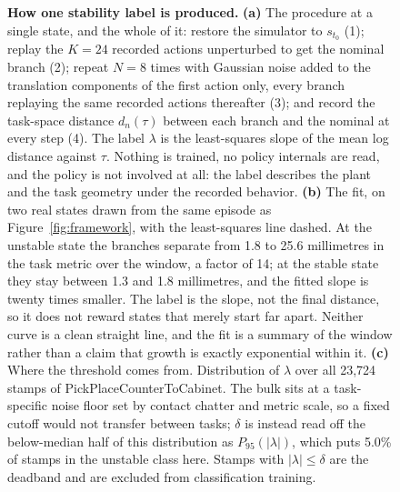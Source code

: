 \begin{figure}[t]
\caption{\textbf{How one stability label is produced.}
\textbf{(a)} The procedure at a single state, and the whole of it: restore the
simulator to $s_{t_0}$ (1); replay the $K{=}24$ recorded actions unperturbed to
get the nominal branch (2); repeat $N{=}8$ times with Gaussian noise added to
the translation components of the first action only, every branch replaying the
same recorded actions thereafter (3); and record the task-space distance
$d_n(\tau)$ between each branch and the nominal at every step (4). The label
$\lambda$ is the least-squares slope of the mean log distance against $\tau$.
Nothing is trained, no policy internals are read, and the policy is not involved
at all: the label describes the plant and the task geometry under the recorded
behavior.
\textbf{(b)} The fit, on two real states drawn from the same episode as
Figure~\ref{fig:framework}, with the least-squares line dashed. At the unstable
state the branches separate from 1.8 to 25.6 millimetres in the task metric
over the window, a factor of 14; at the stable state they stay between 1.3 and
1.8 millimetres,
and the fitted slope is twenty times smaller. The label is the slope,
not the final distance, so it does not reward states that merely start far
apart. Neither curve is a clean straight line, and the fit is a summary of the
window rather than a claim that growth is exactly exponential within it.
\textbf{(c)} Where the threshold comes from. Distribution of $\lambda$ over all
23{,}724 stamps of PickPlaceCounterToCabinet. The bulk sits at a task-specific
noise floor set by contact chatter and metric scale, so a fixed cutoff would not
transfer between tasks; $\delta$ is instead read off the below-median half of
this distribution as $P_{95}(\lvert\lambda\rvert)$, which puts 5.0\% of stamps
in the unstable class here. Stamps with $\lvert\lambda\rvert \le \delta$ are the
deadband and are excluded from classification training.}
\label{fig:labeling}
\end{figure}
